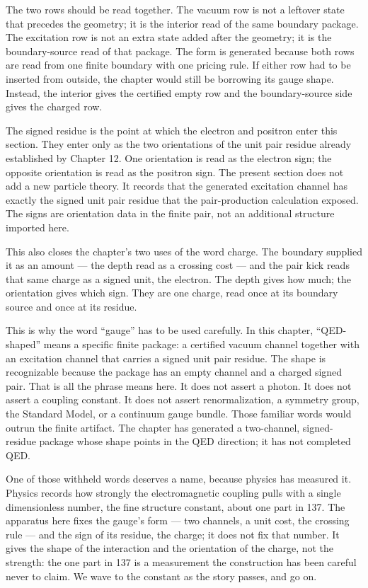The two rows should be read together. The vacuum row is not a leftover state that
precedes the geometry; it is the interior read of the same boundary package. The
excitation row is not an extra state added after the geometry; it is the
boundary-source read of that package. The form is generated because both rows are
read from one finite boundary with one pricing rule. If either row had to be inserted
from outside, the chapter would still be borrowing its gauge shape. Instead, the
interior gives the certified empty row and the boundary-source side gives the charged
row.

The signed residue is the point at which the electron and positron enter this
section. They enter only as the two orientations of the unit pair residue already
established by Chapter 12. One orientation is read as the electron sign; the opposite
orientation is read as the positron sign. The present section does not add a new
particle theory. It records that the generated excitation channel has exactly the
signed unit pair residue that the pair-production calculation exposed. The signs are
orientation data in the finite pair, not an additional structure imported here.

This also closes the chapter's two uses of the word charge. The boundary supplied it
as an amount --- the depth read as a crossing cost --- and the pair kick reads that
same charge as a signed unit, the electron. The depth gives how much; the orientation
gives which sign. They are one charge, read once at its boundary source and once at
its residue.

This is why the word ``gauge'' has to be used carefully. In this chapter,
``QED-shaped'' means a specific finite package: a certified vacuum channel together
with an excitation channel that carries a signed unit pair residue. The shape is
recognizable because the package has an empty channel and a charged signed pair.
That is all the phrase means here. It does not assert a photon. It does not assert a
coupling constant. It does not assert renormalization, a symmetry group, the Standard
Model, or a continuum gauge bundle. Those familiar words would outrun the finite
artifact. The chapter has generated a two-channel, signed-residue package whose
shape points in the QED direction; it has not completed QED.

One of those withheld words deserves a name, because physics has measured it.
Physics records how strongly the electromagnetic coupling pulls with a single
dimensionless number, the fine structure constant, about one part in 137. The
apparatus here fixes the gauge's form --- two channels, a unit cost, the crossing
rule --- and the sign of its residue, the charge; it does not fix that number. It
gives the shape of the interaction and the orientation of the charge, not the
strength: the one part in 137 is a measurement the construction has been careful
never to claim. We wave to the constant as the story passes, and go on.

